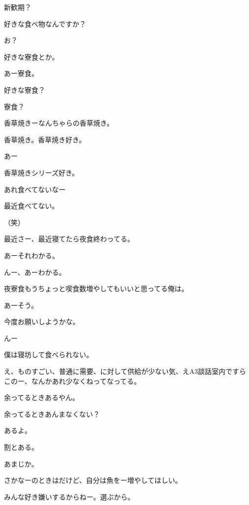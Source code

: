 \begin{multicols}{3}
{        新歓期？

        好きな食べ物なんですか？

        お？

        好きな寮食とか。

        あー寮食。

        好きな寮食？

        寮食？

        香草焼きーなんちゃらの香草焼き。

        香草焼き。香草焼き好き。

        あー

        香草焼きシリーズ好き。

        あれ食べてないなー

        最近食べてない。

        （笑）

        最近さー、最近寝てたら夜食終わってる。

        あーそれわかる。

        んー、あーわかる。

        夜寮食もうちょっと喫食数増やしてもいいと思ってる俺は。

        あーそう。

        今度お願いしようかな。

        んー

        僕は寝坊して食べられない。

        え、ものすごい、普通に需要、に対して供給が少ない気、えA3談話室内ですらこのー、なんかあれ少なくねってなってる。

        余ってるときあるやん。

        余ってるときあんまなくない？

        あるよ。

        割とある。

        あまじか。

        さかなーのときはだけど、自分は魚をー増やしてほしい。

        みんな好き嫌いするからねー。選ぶから。

}
\end{multicols}
